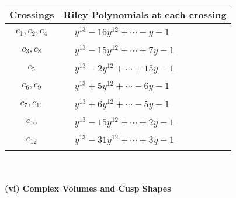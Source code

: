 \documentclass[1p]{elsarticle_modified}
\theoremstyle{definition}
\begin{document}
\begin{tabular}{m{50pt}|m{274pt}}
Crossings & \hspace{64pt}Riley Polynomials at each crossing \\
\hline $$\begin{aligned}c_{1},c_{2},c_{4}\end{aligned}$$&$\begin{aligned}
&y^{13}-16 y^{12}+\cdots- y-1
\end{aligned}$\\
\hline $$\begin{aligned}c_{3},c_{8}\end{aligned}$$&$\begin{aligned}
&y^{13}-15 y^{12}+\cdots+7 y-1
\end{aligned}$\\
\hline $$\begin{aligned}c_{5}\end{aligned}$$&$\begin{aligned}
&y^{13}-2 y^{12}+\cdots+15 y-1
\end{aligned}$\\
\hline $$\begin{aligned}c_{6},c_{9}\end{aligned}$$&$\begin{aligned}
&y^{13}+5 y^{12}+\cdots-6 y-1
\end{aligned}$\\
\hline $$\begin{aligned}c_{7},c_{11}\end{aligned}$$&$\begin{aligned}
&y^{13}+6 y^{12}+\cdots-5 y-1
\end{aligned}$\\
\hline $$\begin{aligned}c_{10}\end{aligned}$$&$\begin{aligned}
&y^{13}-15 y^{12}+\cdots+2 y-1
\end{aligned}$\\
\hline $$\begin{aligned}c_{12}\end{aligned}$$&$\begin{aligned}
&y^{13}-31 y^{12}+\cdots+3 y-1
\end{aligned}$\\
\hline
\end{tabular}\\~\\
\newpage\flushleft \textbf{(vi) Complex Volumes and Cusp Shapes}
\end{document}
